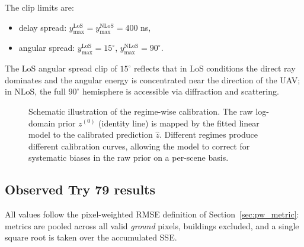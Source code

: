 \documentclass[11pt,a4paper]{article}
\begin{document}
The clip limits are:
\begin{itemize}
\item delay spread: $y_{\max}^{\mathrm{LoS}} = y_{\max}^{\mathrm{NLoS}} = 400$ ns,
\item angular spread: $y_{\max}^{\mathrm{LoS}} = 15^\circ$,
      $y_{\max}^{\mathrm{NLoS}} = 90^\circ$.
\end{itemize}

The LoS angular spread clip of $15^\circ$ reflects that in LoS conditions the
direct ray dominates and the angular energy is concentrated near the direction
of the UAV; in NLoS, the full $90^\circ$ hemisphere is accessible via
diffraction and scattering.

\begin{figure}[H]
\centering
{}
\caption{Schematic illustration of the regime-wise calibration. The raw
log-domain prior $z^{(0)}$ (identity line) is mapped by the fitted linear
model to the calibrated prediction $\hat{z}$. Different regimes produce
different calibration curves, allowing the model to correct for systematic
biases in the raw prior on a per-scene basis.}
\label{fig:spread_cal}
\end{figure}

\subsection{Observed Try 79 results}

All values follow the pixel-weighted RMSE definition of
Section~\ref{sec:pw_metric}: metrics are pooled across all valid \emph{ground}
pixels, buildings excluded, and a single square root is taken over the
accumulated SSE.
\end{document}

